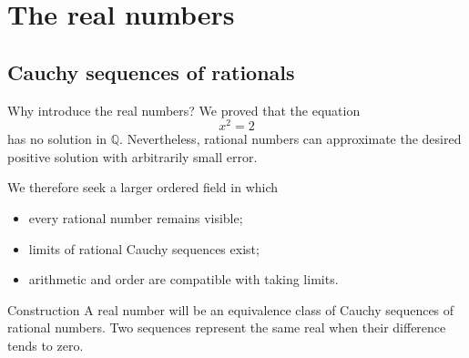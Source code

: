 \documentclass[aspectratio=169,11pt]{beamer}
\newcommand{\Q}{\mathbb Q}
\begin{document}
\section{The real numbers}

\subsection{Cauchy sequences of rationals}

\begin{frame}{Why introduce the real numbers?}
  We proved that the equation
  \[
    x^2=2
  \]
  has no solution in \(\Q\).  Nevertheless, rational numbers can approximate
  the desired positive solution with arbitrarily small error.

  We therefore seek a larger ordered field in which
  \begin{itemize}
    \item every rational number remains visible;
    \item limits of rational Cauchy sequences exist;
    \item arithmetic and order are compatible with taking limits.
  \end{itemize}

  \begin{alertblock}{Construction}
    A real number will be an equivalence class of Cauchy sequences of rational
    numbers.  Two sequences represent the same real when their difference
    tends to zero.
  \end{alertblock}
\end{frame}
\end{document}

